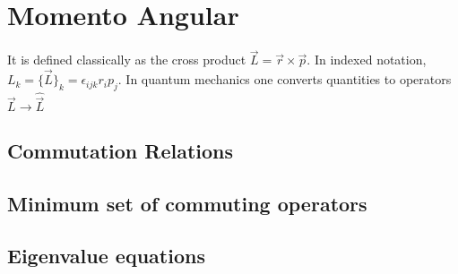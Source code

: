 \setchapterpreamble[u]{\margintoc}
\chapter{Momento Angular}

It is defined classically as the cross product $\vec L = \vec r \times \vec p$. In indexed notation, $L_k = \{\vec L\}_k = \epsilon _{ijk} r_i p_j$.
In quantum mechanics one converts quantities to operators $\vec L \rightarrow \hat{\vec L}$ 

\section{Commutation Relations}
\section{Minimum set of commuting operators}
\section{Eigenvalue equations}






